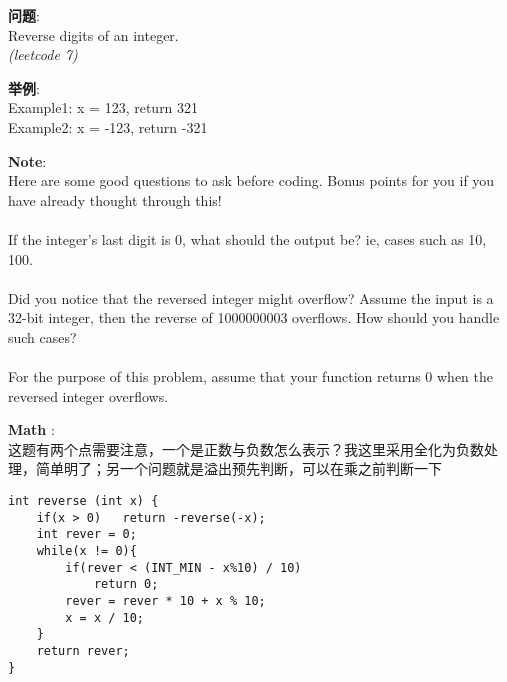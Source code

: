     
\begin{description}
    \item{\textbf{问题}}:\\
Reverse digits of an integer.\\
\textit{(leetcode 7)}
    \item{\textbf{举例}}:\\
Example1: x = 123, return 321\\
Example2: x = -123, return -321
    \item{\textbf{Note}}:\\
Here are some good questions to ask before coding. Bonus points for you if you have already thought through this!\\
\\
If the integer's last digit is 0, what should the output be? ie, cases such as 10, 100.\\
\\
Did you notice that the reversed integer might overflow? Assume the input is a 32-bit integer, then the reverse of 1000000003 overflows. How should you handle such cases?\\
\\
For the purpose of this problem, assume that your function returns 0 when the reversed integer overflows.\\
    \item{\textbf{Math}} : 
    \\这题有两个点需要注意，一个是正数与负数怎么表示？我这里采用全化为负数处理，简单明了；另一个问题就是溢出预先判断，可以在乘之前判断一下
    \begin{lstlisting}
int reverse (int x) {
	if(x > 0)	return -reverse(-x);
	int rever = 0;
	while(x != 0){
		if(rever < (INT_MIN - x%10) / 10)
			return 0;
		rever = rever * 10 + x % 10;
		x = x / 10;
	}
	return rever;
}
    \end{lstlisting}
\end{description}
